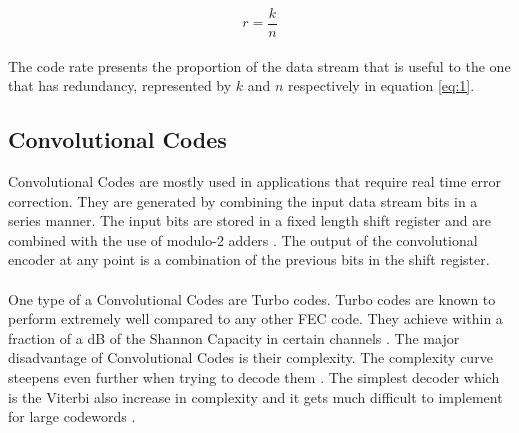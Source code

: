 \documentclass[11pt]{report}
\begin{document}
\begin{equation}
r = \frac{k}{n}
\label{eq:1}
\end{equation}{}
\\
The code rate presents the proportion of the data stream that is useful to the one that has redundancy, represented by $k$ and $n$ respectively in equation \ref{eq:1}.

\subsection{Convolutional Codes}
Convolutional Codes are mostly used in applications that require real time error correction. They are generated by combining the input data stream bits in a series manner. The input bits are stored in a fixed length shift register and are combined with the use of modulo-2 adders \cite{53}. The output of the convolutional encoder at any point is a combination of the previous bits in the shift register.
\\
\\
One type of a Convolutional Codes are Turbo codes. Turbo codes are known to perform extremely well compared to any other FEC code. They achieve within a fraction of a dB of the Shannon Capacity in certain channels \cite{B11}. The major disadvantage of Convolutional Codes is their complexity. The complexity curve steepens even further when trying to decode them \cite{B11}. The simplest decoder which is the Viterbi also increase in complexity and it gets much difficult to implement for large codewords
\cite{54}.



\end{document}
